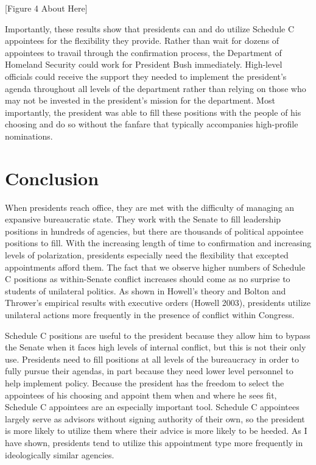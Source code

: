 \documentclass[12pt]{article}
\begin{document}
\begin{center}[Figure 4 About Here]\end{center}

Importantly, these results show that presidents can and do utilize Schedule C appointees for the flexibility they provide. Rather than wait for dozens of appointees to travail through the confirmation process, the Department of Homeland Security could work for President Bush immediately. High-level officials could receive the support they needed to implement the president's agenda throughout all levels of the department rather than relying on those who may not be invested in the president's mission for the department. Most importantly, the president was able to fill these positions with the people of his choosing and do so without the fanfare that typically accompanies high-profile nominations. 

\section*{Conclusion}	
When presidents reach office, they are met with the difficulty of managing an expansive bureaucratic state. They work with the Senate to fill leadership positions in hundreds of agencies, but there are thousands of political appointee positions to fill. With the increasing length of time to confirmation and increasing levels of polarization, presidents especially need the flexibility that excepted appointments afford them. The fact that we observe higher numbers of Schedule C positions as within-Senate conflict increases should come as no surprise to students of unilateral politics. As shown in Howell's theory and Bolton and Thrower's empirical results with executive orders (Howell 2003), presidents utilize unilateral actions more frequently in the presence of conflict within Congress.

Schedule C positions are useful to the president because they allow him to bypass the Senate when it faces high levels of internal conflict, but this is not their only use. Presidents need to fill positions at all levels of the bureaucracy in order to fully pursue their agendas, in part because they need lower level personnel to help implement policy. Because the president has the freedom to select the appointees of his choosing and appoint them when and where he sees fit, Schedule C appointees are an especially important tool. Schedule C appointees largely serve as advisors without signing authority of their own, so the president is more likely to utilize them where their advice is more likely to be heeded. As I have shown, presidents tend to utilize this appointment type more frequently in ideologically similar agencies.
\end{document}
